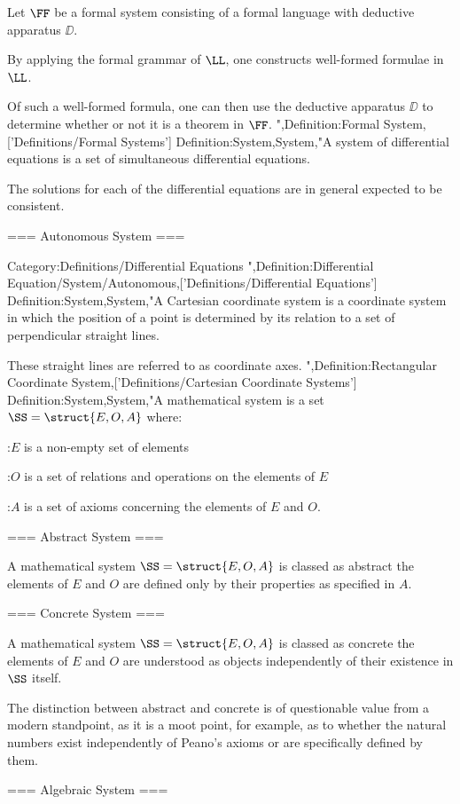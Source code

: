 Let $\FF$ be a formal system consisting of a formal language with deductive apparatus $\DD$.

By applying the formal grammar of $\LL$, one constructs well-formed formulae in $\LL$.

Of such a well-formed formula, one can then use the deductive apparatus $\DD$ to determine whether or not it is a theorem in $\FF$.
",Definition:Formal System,['Definitions/Formal Systems']
Definition:System,System,"A system of differential equations is a set of simultaneous differential equations.

The solutions for each of the differential equations are in general expected to be consistent.


=== Autonomous System ===


Category:Definitions/Differential Equations
",Definition:Differential Equation/System/Autonomous,['Definitions/Differential Equations']
Definition:System,System,"A Cartesian coordinate system is a coordinate system in which the position of a point is determined by its relation to a set of perpendicular straight lines.

These straight lines are referred to as coordinate axes.
",Definition:Rectangular Coordinate System,['Definitions/Cartesian Coordinate Systems']
Definition:System,System,"A mathematical system is a set $\SS = \struct {E, O, A}$ where:

:$E$ is a non-empty set of elements

:$O$ is a set of relations and operations on the elements of $E$

:$A$ is a set of axioms concerning the elements of $E$ and $O$.


=== Abstract System ===

A mathematical system $\SS = \struct {E, O, A}$ is classed as abstract  the elements of $E$ and $O$ are defined only by their properties as specified in $A$.


=== Concrete System ===

A mathematical system $\SS = \struct {E, O, A}$ is classed as concrete  the elements of $E$ and $O$ are understood as objects independently of their existence in $\SS$ itself.


The distinction between abstract and concrete is of questionable value from a modern standpoint, as it is a moot point, for example, as to whether the natural numbers exist independently of Peano's axioms or are specifically defined by them.


=== Algebraic System ===

